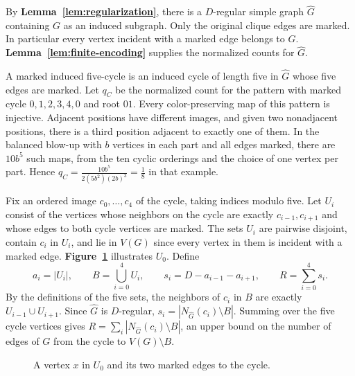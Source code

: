 \documentclass[preprint,11pt,numbers]{elsarticle-arxiv}
\numberwithin{equation}{section}
\theoremstyle{definition}
\begin{document}
By \textbf{Lemma~\ref{lem:regularization}}, there is a $D$-regular
simple graph $\widehat G$ containing $G$ as an induced subgraph.
Only the original clique edges are marked. In particular every vertex
incident with a marked edge belongs to $G$.
\textbf{Lemma~\ref{lem:finite-encoding}} supplies the normalized
counts for $\widehat G$.

A marked induced five-cycle is an induced cycle of length five in
$\widehat G$ whose five edges are marked. Let $q_C$ be the normalized
count for the pattern with marked cycle $0,1,2,3,4,0$ and root $01$.
Every color-preserving map of this pattern is injective. Adjacent
positions have different images, and given two nonadjacent positions,
there is a third position adjacent to exactly one of them.
In the balanced blow-up with $b$ vertices in each part and all
edges marked, there are $10b^5$ such maps, from the ten cyclic
orderings and the choice of one vertex per part. Hence
$q_C=\frac{10b^5}{2(5b^2)(2b)^3}=\frac{1}{8}$ in that example.

Fix an ordered image $c_0,\ldots,c_4$ of the cycle, taking indices
modulo five. Let $U_i$ consist of the vertices whose neighbors on
the cycle are exactly $c_{i-1},c_{i+1}$ and whose edges to both
cycle vertices are marked. The sets $U_i$ are pairwise disjoint,
contain $c_i$ in $U_i$, and lie in $V(G)$ since every vertex in
them is incident with a marked edge.
\textbf{Figure~\ref{fig:odd-cycle-parts}} illustrates $U_0$. Define
\begin{equation}\label{eq:odd-core-defs}
 a_i=|U_i|,\qquad B=\bigcup_{i=0}^4 U_i,\qquad
 s_i=D-a_{i-1}-a_{i+1},\qquad R=\sum_{i=0}^4 s_i.
\end{equation}
By the definitions of the five sets, the neighbors of $c_i$ in $B$
are exactly $U_{i-1}\cup U_{i+1}$. Since $\widehat G$ is $D$-regular,
$s_i=|N_{\widehat G}(c_i)\setminus B|$. Summing over the five cycle
vertices gives $R=\sum_i|N_{\widehat G}(c_i)\setminus B|$, an upper
bound on the number of edges of $G$ from the cycle to $V(G)\setminus B$.

\begin{figure}[htbp]
\centering
{}
\caption{A vertex $x$ in $U_0$ and its two marked edges to the cycle.}
\label{fig:odd-cycle-parts}
\end{figure}
\relax\space%
\end{document}
